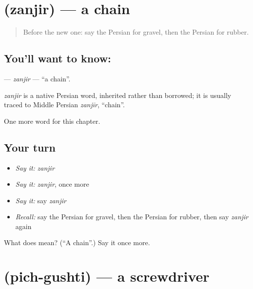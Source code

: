 \section[\texorpdfstring{\fa{زنجیر} (zanjir)}{زنجیر (zanjir)}]{ (zanjir) — a chain}

\label{lesson:FA-C283-zanjir}



\begin{quote}
Before the new one: say the Persian for gravel, then the Persian for rubber.
\end{quote}

\subsection*{You'll want to know: }
\textbf{} — \emph{zanjir} — \textquotedblleft{}a chain\textquotedblright{}.

\begin{cousinweb}
\emph{zanjir} is a native Persian word, inherited rather than borrowed; it is usually traced to Middle Persian \emph{zanjīr}, \textquotedblleft{}chain\textquotedblright{}.
\end{cousinweb}

\begin{grammarlens}[title={What you've built}]
One more word for this chapter.
\end{grammarlens}

\subsection*{Your turn}
\begin{itemize}
\raggedright
  \item \emph{Say it:} \emph{zanjir}
  \item \emph{Say it:} \emph{zanjir}, once more
  \item \emph{Say it:} say \emph{zanjir}
  \item \emph{Recall:} say the Persian for gravel, then the Persian for rubber, then say \emph{zanjir} again
\end{itemize}

\begin{tcolorbox}[breakable,colback=teal!4,colframe=teal!35!black,title={Before you move on}]
What does  mean? (\textquotedblleft{}A chain\textquotedblright{}.) Say it once more.
\end{tcolorbox}
\section[\texorpdfstring{\fa{پیچ} \fa{گوشتی} (pich-gushti)}{پیچ گوشتی (pich-gushti)}]{  (pich-gushti) — a screwdriver}

